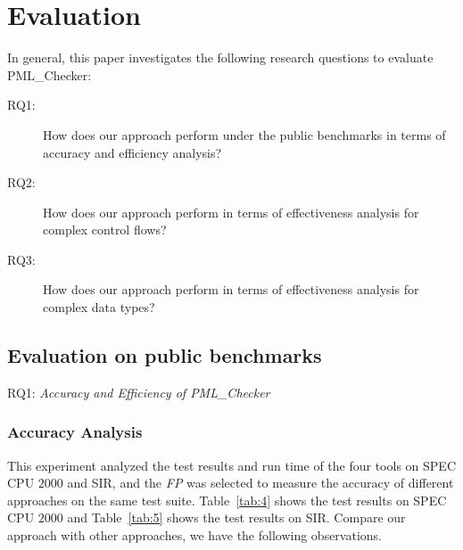 \section{Evaluation}\label{sec:evaluation}

In general, this paper investigates the following research questions to evaluate PML\_Checker:
\begin{description}
\item[RQ1:] How does our approach perform under the public benchmarks in terms of accuracy and efficiency analysis? 
\item[RQ2:] How does our approach perform in terms of effectiveness analysis for complex control flows? 
\item[RQ3:] How does our approach perform in terms of effectiveness analysis for complex data types? 
\end{description}

\subsection{Evaluation on public benchmarks}

\noindent RQ1: \textit{Accuracy and Efficiency of PML\_Checker}

\subsubsection{Accuracy Analysis} 

This experiment analyzed the test results and run time of the four tools on SPEC CPU $2000$ and SIR, and the \textit{FP} was selected to measure the accuracy of different approaches on the same test suite. Table~\ref{tab:4} shows the test results on SPEC CPU $2000$ and Table~\ref{tab:5} shows the test results on SIR. Compare our approach with other approaches, we have the following observations. 

